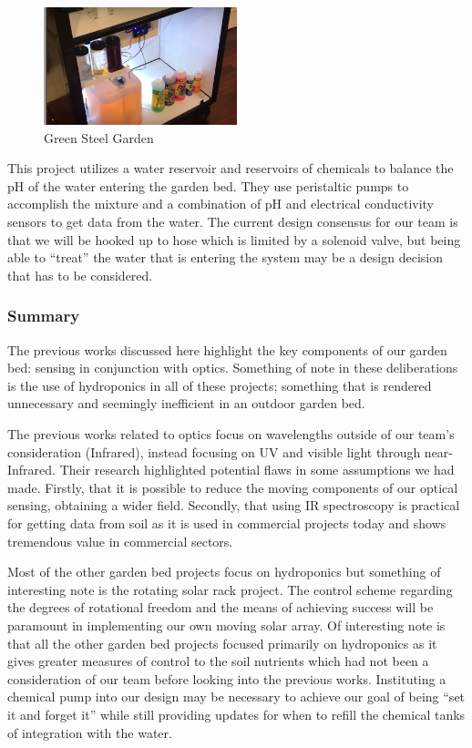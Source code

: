 \begin{figure}[H]
    \caption{Green Steel Garden}
    \centering
    \includegraphics[width=0.5\textwidth]{images/3-1-6Pic.png}
\end{figure}

This project utilizes a water reservoir and reservoirs of chemicals to balance the pH of the water entering the garden bed. They use peristaltic pumps to accomplish the mixture and a combination of pH and electrical conductivity sensors to get data from the water. The current design consensus for our team is that we will be hooked up to hose which is limited by a solenoid valve, but being able to ``treat'' the water that is entering the system may be a design decision that has to be considered.

\subsubsection{Summary}

The previous works discussed here highlight the key components of our garden bed: sensing in conjunction with optics. Something of note in these deliberations is the use of hydroponics in all of these projects; something that is rendered unnecessary and seemingly inefficient in an outdoor garden bed.

The previous works related to optics focus on wavelengths outside of our team's consideration (Infrared), instead focusing on UV and visible light through near-Infrared. Their research highlighted potential flaws in some assumptions we had made. Firstly, that it is possible to reduce the moving components of our optical sensing, obtaining a wider field. Secondly, that using IR spectroscopy is practical for getting data from soil as it is used in commercial projects today and shows tremendous value in commercial sectors.

Most of the other garden bed projects focus on hydroponics but something of interesting note is the rotating solar rack project. The control scheme regarding the degrees of rotational freedom and the means of achieving success will be paramount in implementing our own moving solar array. Of interesting note is that all the other garden bed projects focused primarily on hydroponics as it gives greater measures of control to the soil nutrients which had not been a consideration of our team before looking into the previous works. Instituting a chemical pump into our design may be necessary to achieve our goal of being ``set it and forget it'' while still providing updates for when to refill the chemical tanks of integration with the water.

